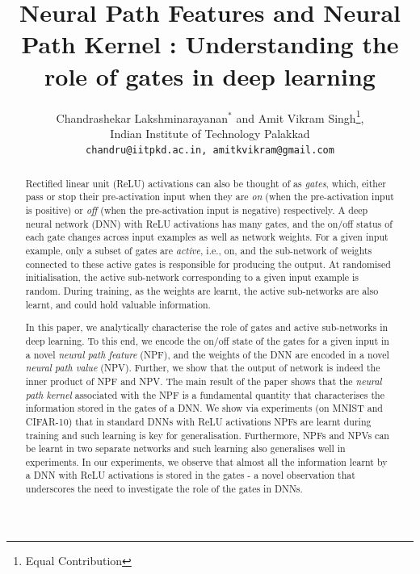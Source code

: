 \documentclass{article}
\title{Neural Path Features and Neural Path Kernel : Understanding the role of gates in deep learning}
\author{Chandrashekar Lakshminarayanan${}^*$ and Amit Vikram Singh\thanks{Equal Contribution}, \\ Indian Institute of Technology Palakkad\\\texttt{chandru@iitpkd.ac.in, amitkvikram@gmail.com}}
\begin{document}
\maketitle
\begin{abstract}
Rectified linear unit (ReLU) activations can also be thought of as \emph{gates}, which, either pass or stop their pre-activation input when they are \emph{on} (when the pre-activation input is positive) or \emph{off} (when the pre-activation input is negative) respectively. A deep neural network (DNN) with ReLU activations has many gates, and the {on/off} status of each gate changes across input examples as well as network weights. For a given input example, only a subset of gates are \emph{active}, i.e., on, and the sub-network of weights connected to these active gates is responsible for producing the output. At randomised initialisation, the active sub-network corresponding to a given input example is random. During training, as the weights are learnt, the active sub-networks are also learnt, and could hold valuable information. 

In this paper, we analytically characterise the role of gates and active sub-networks in deep learning. To this end, we encode the {on/off} state of the gates for a given input in a novel \emph{neural path feature} (NPF), and the weights of the DNN are encoded in a novel \emph{neural path value} (NPV). Further, we show that the output of network is indeed the inner product of NPF and NPV.  The main result of the paper shows that the \emph{neural path kernel} associated with the NPF is a fundamental quantity that characterises the information stored in the gates of a DNN. We show via experiments (on MNIST and CIFAR-10) that in standard DNNs with ReLU activations NPFs are learnt during training and such learning is key for generalisation. Furthermore, NPFs and NPVs can be learnt in two separate networks and such learning also generalises well in experiments. In our experiments, we observe that almost all the information learnt by a DNN with ReLU activations is stored in the gates - a novel observation that underscores the need to investigate the role of the gates in DNNs.
\end{abstract}
\end{document}
